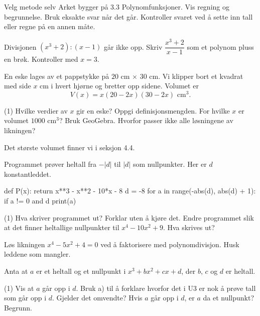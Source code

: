 
\begin{infoboks}{Velg metode selv}
Arket bygger på 3.3 Polynomfunksjoner. Vis regning og begrunnelse. Bruk eksakte svar når det går.
Kontroller svaret ved å sette inn tall eller regne på en annen måte.
\end{infoboks}


Divisjonen $(x^3 + 2) : (x - 1)$ går ikke opp. Skriv $\dfrac{x^3 + 2}{x - 1}$ som et polynom pluss en brøk. Kontroller med $x = 3$.

En eske lages av et pappstykke på $20$ cm $\times$ $30$ cm. Vi klipper bort et kvadrat med side $x$ cm i hvert hjørne og bretter opp sidene. Volumet er
\[ V(x) = x(20 - 2x)(30 - 2x) \text{ cm}^3. \]
\begin{tasks}(1)
  \task Hvilke verdier av $x$ gir en eske? Oppgi definisjonsmengden.
  \task For hvilke $x$ er volumet $1000$ cm$^3$? Bruk GeoGebra. Hvorfor passer ikke alle løsningene av likningen?
\end{tasks}
Det største volumet finner vi i seksjon 4.4.

Programmet prøver heltall fra $-|d|$ til $|d|$ som nullpunkter. Her er $d$ konstantleddet.
\begin{kode}
def P(x):
    return x**3 - x**2 - 10*x - 8
d = -8
for a in range(-abs(d), abs(d) + 1):
    if a != 0 and d %
        print(a)
\end{kode}
\begin{tasks}(1)
  \task Hva skriver programmet ut? Forklar uten å kjøre det.
  \task Endre programmet slik at det finner heltallige nullpunkter til $x^4 - 10x^2 + 9$. Hva skrives ut?
\end{tasks}

Løs likningen $x^4 - 5x^2 + 4 = 0$ ved å faktorisere med polynomdivisjon. Husk leddene som mangler.


Anta at $a$ er et heltall og et nullpunkt i $x^3 + bx^2 + cx + d$, der $b$, $c$ og $d$ er heltall.
\begin{tasks}(1)
  \task Vis at $a$ går opp i $d$.
  \task Bruk a) til å forklare hvorfor det i U3 er nok å prøve tall som går opp i $d$.
  \task Gjelder det omvendte? Hvis $a$ går opp i $d$, er $a$ da et nullpunkt? Begrunn.
\end{tasks}

